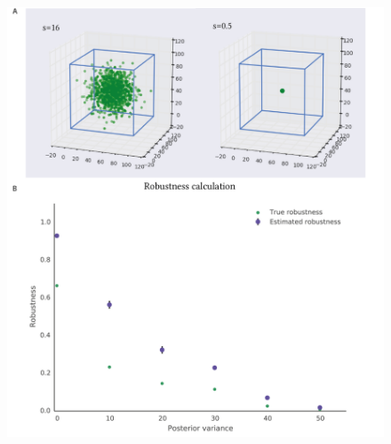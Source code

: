 \begin{figure}[htbp]
\centering
\includegraphics[scale=0.6]{chapterStabilityFinder/images/robustness_calc_norm.png}
\caption[LoF caption]{}
\label{}
\end{figure}
\clearpage
